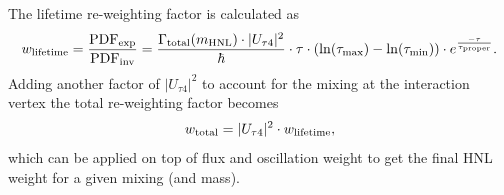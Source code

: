 The lifetime re-weighting factor is calculated as
\begin{equation}
    w_\mathrm{lifetime} = \frac{\mathrm{PDF}_\mathrm{exp}}{\mathrm{PDF}_\mathrm{inv}} = \frac{\Gamma_\mathrm{total}(m_\mathrm{HNL}) \cdot |U_{\tau4}|^2}{\hbar} \cdot \tau \cdot (\ln(\tau_\mathrm{max}) - \ln(\tau_\mathrm{min})) \cdot e^{\frac{-\tau}{\tau_\mathrm{proper}}}.
    \labeq{weight_lifetime}
\end{equation}
Adding another factor of $|U_{\tau4}|^2$ to account for the mixing at the interaction vertex the total re-weighting factor becomes
\begin{equation}
    w_\mathrm{total} = |U_{\tau4}|^2 \cdot w_\mathrm{lifetime},
    \labeq{weight_full}
\end{equation}
which can be applied on top of flux and oscillation weight to get the final HNL weight for a given mixing (and mass).
